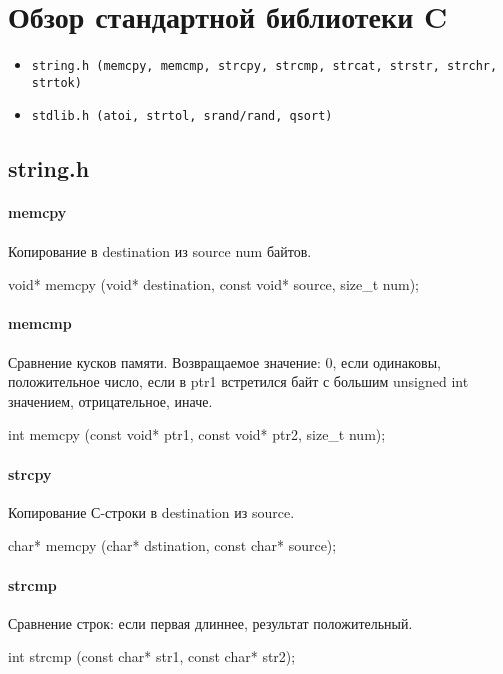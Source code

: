 % 
% 
\section{Обзор стандартной библиотеки C}
\begin{itemize}[noitemsep]
    \item \begin{verbatim}string.h (memcpy, memcmp, strcpy, strcmp, strcat, strstr, strchr, strtok)\end{verbatim}
    \item \begin{verbatim}stdlib.h (atoi, strtol, srand/rand, qsort)\end{verbatim}
\end{itemize}
\subsection{string.h}
\paragraph{memcpy}
Копирование в destination из source num байтов.
\begin{ccode}
void* memcpy (void* destination, const void* source, size_t num);
\end{ccode}
\paragraph{memcmp}
Сравнение кусков памяти. Возвращаемое значение: 0, если одинаковы, положительное число, если в ptr1 встретился байт с большим unsigned int значением, отрицательное, иначе.
\begin{ccode}
int memcpy (const void* ptr1, const void* ptr2, size_t num);
\end{ccode}
\paragraph{strcpy}
Копирование С-строки в destination из source.
\begin{ccode}
char* memcpy (char* dstination, const char* source);
\end{ccode}
\paragraph{strcmp}
Сравнение строк: если первая длиннее, результат положительный.
\begin{ccode}
int strcmp (const char* str1, const char* str2);
\end{ccode}

